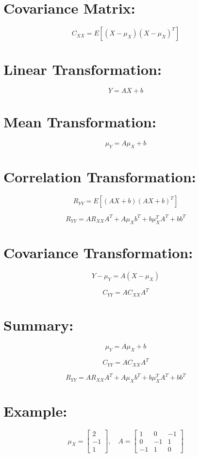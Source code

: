 \documentclass[11pt]{article}
\begin{document}
\section{Covariance Matrix:}

\[
C_{XX} = E[(X - \mu_X)(X - \mu_X)^T]
\]

\section{Linear Transformation:}

\[
Y = AX + b
\]

\section{Mean Transformation:}


\[
\mu_Y = A\mu_X + b
\]


\section{Correlation Transformation:}

\[
R_{YY} = E[(AX + b)(AX + b)^T]
\]

\[
R_{YY} = A R_{XX} A^T + A\mu_X b^T + b\mu_X^T A^T + bb^T
\]

\section{Covariance Transformation:}

\[
Y - \mu_Y = A(X - \mu_X)
\]


\[
C_{YY} = A C_{XX} A^T
\]

\section{Summary:}

\[
\mu_Y = A\mu_X + b
\]

\[
C_{YY} = A C_{XX} A^T
\]

\[
R_{YY} = A R_{XX} A^T + A\mu_X b^T + b\mu_X^T A^T + bb^T
\]


\section{Example:}

\[
\mu_X =
\begin{bmatrix}
2 \\ -1 \\ 1
\end{bmatrix}, \quad
A =
\begin{bmatrix}
1 & 0 & -1 \\
0 & -1 & 1 \\
-1 & 1 & 0
\end{bmatrix}
\]
\end{document}

